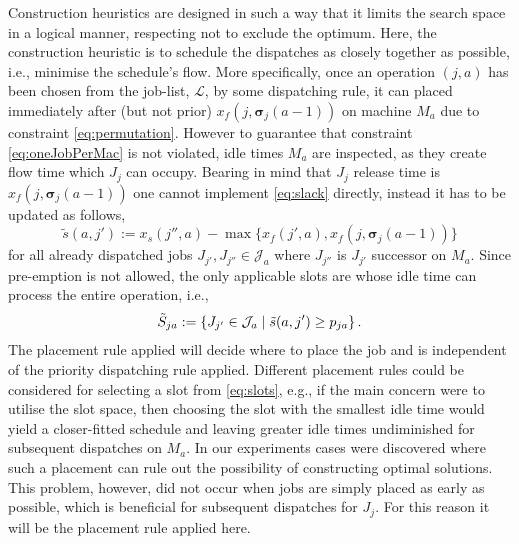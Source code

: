 \documentclass[smallextended]{svjour3}
\renewcommand{\vsigma}{\bm \sigma}
\begin{document}
Construction heuristics are designed in such a way that it limits the search 
space in a logical manner, respecting not to exclude the optimum. Here, the 
construction heuristic is to schedule the dispatches as closely together as 
possible, i.e., minimise the schedule's flow. 
More specifically, once an operation $(j,a)$ has been chosen from the job-list, 
$\mathcal{L}$, by some dispatching rule, it can placed immediately after (but 
not prior) $x_f(j,\vsigma_j(a-1))$ on machine $M_a$ due to constraint 
\cref{eq:permutation}. 
However to guarantee that constraint \cref{eq:oneJobPerMac} is not violated, 
idle times $M_a$ are inspected, as they create flow time  which $J_j$ can 
occupy. Bearing in mind that $J_j$ release time is $x_f(j,\vsigma_j(a-1))$ one 
cannot implement \cref{eq:slack} directly, instead it has to be updated as 
follows,
\begin{equation}
\tilde{s}(a,j'):= x_s(j'',a)-\max\{x_f(j',a),x_f(j,\vsigma_j(a-1))\} %
\end{equation}
for all already dispatched jobs $J_{j'},J_{j''}\in \mathcal{J}_a$ where 
$J_{j''}$ is $J_{j'}$ successor on $M_a$. Since pre-emption is not allowed, the 
only applicable slots are whose idle time can process the entire operation, 
i.e.,
\begin{equation}
\tilde{S}_{ja} := \left\{J_{j'}\in \mathcal{J}_a\;\middle|\;\tilde{s}(a,j')\geq p_{ja} 
\right\}\label{eq:slots}.
\end{equation} 
The placement rule applied will decide where to place the job and 
is independent of the priority dispatching rule applied. 
Different placement rules could be considered for selecting a slot from 
\cref{eq:slots}, e.g., if the main concern were to utilise the slot space, then 
choosing the slot with the smallest idle time would yield a closer-fitted 
schedule and leaving greater idle times undiminished for subsequent dispatches 
on $M_a$.
In our experiments cases were discovered where such a placement can rule out 
the possibility of constructing optimal solutions.
This problem, however, did not occur when jobs are simply placed as early as 
possible, which is beneficial for subsequent dispatches for $J_j$. 
For this reason it will be the placement rule applied here.
\end{document}

